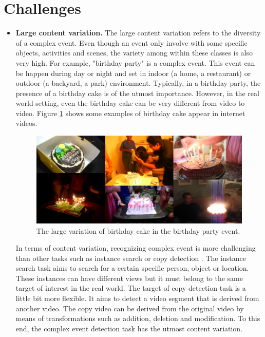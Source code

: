 \section{Challenges}
\label{c1_challenges}
\begin{itemize}
	\item{\textbf{Large content variation.}} The large content variation refers to the diversity of a complex event. Even though an event only involve with some specific objects, activities and scenes, the variety among within these classes is also very high. For example, "birthday party" is a complex event. This event can be happen during day or night and set in indoor (a home, a restaurant) or outdoor (a backyard, a park) environment. Typically, in a birthday party, the presence of a birthday cake is of the utmost importance. However, in the real world setting, even the birthday cake can be very different from video to video. Figure \ref{c1_largecontent} shows some examples of birthday cake appear in internet videos. 
	\begin{figure}
		\centering
		\includegraphics[width=1\textwidth]{largecontent.png}
		\caption{The large variation of birthday cake in the birthday party event.}
		\label{c1_largecontent}
	\end{figure}
	
	In terms of content variation, recognizing complex event is more challenging than other tasks such as instance search  or copy detection . The instance search task aims to search for a certain specific person, object or location. These instances can have different views but it must belong to the same target of interest in the real world. The target of copy detection task is a little bit more flexible. It aims to detect a video segment that is derived from another video. The copy video can be derived from the original video by means of transformations such as addition, deletion and modification. To this end, the complex event detection task has the utmost content variation.
	 

\end{itemize}
